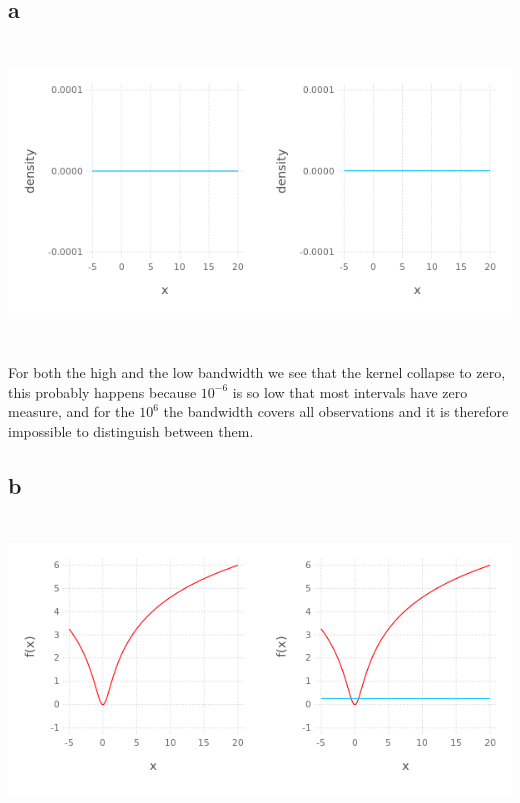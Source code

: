\documentclass{article}
\begin{document}
\subsection{a}
\begin{center}
\includegraphics[width=16cm, height=8cm]{Q3-a.png}
\end{center}

For both the high and the low bandwidth we see that the kernel collapse to zero,
this probably happens because $10^{-6}$ is so low that most intervals have zero
measure, and for the $10^6$ the bandwidth covers all observations and it is 
therefore impossible to distinguish between them.

\subsection{b}
\begin{center}
\includegraphics[width=16cm, height=8cm]{Q3-b.png}
\end{center}
\end{document}
